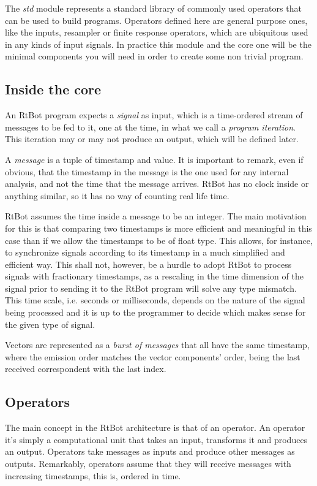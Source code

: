 \documentclass[preprint,1p,times]{elsarticle}
\begin{document}
The \textit{std} module represents a standard library of commonly used operators that can 
be used to build programs. Operators defined here are general purpose ones, like 
the inputs, resampler or finite response operators, which are ubiquitous used in 
any kinds of input signals. In practice this module and the core one will be the 
minimal components you will need in order to create some non trivial program.

\subsection{Inside the core}
An RtBot program expects a \textit{signal} as input, which is a time-ordered stream of 
messages to be fed to it, one at the time, in what we call a \textit{program iteration}. 
This iteration may or may not produce an output, which will be defined later.

A \textit{message} is a tuple of timestamp and value. It is important to remark, even if 
obvious, that the timestamp in the message is the one used for any internal 
analysis, and not the time that the message arrives. RtBot has no clock inside or 
anything similar, so it has no way of counting real life time.


RtBot assumes the time inside a message to be an integer. The main motivation for 
this is that comparing two timestamps is more efficient and meaningful in this 
case than if we allow the timestamps to be of float type. This allows, for 
instance, to synchronize signals according to its timestamp in a much simplified 
and efficient way. This shall not, however, be a hurdle to adopt RtBot to process 
signals with fractionary timestamps, as a rescaling in the time dimension of the 
signal prior to sending it to the RtBot program will solve any type mismatch. This 
time scale, i.e. seconds or milliseconds, depends on the nature of the signal 
being processed and it is up to the programmer to decide which makes sense for the 
given type of signal.


Vectors are represented as a \textit{burst of messages} that all have the same timestamp,
where the emission order matches the vector components' order, being the last received
correspondent with the last index.

\subsection{Operators}
The main concept in the RtBot architecture is that of an operator. An operator 
it’s simply a computational unit that takes an input, transforms it and produces 
an output. Operators take messages as inputs and produce other messages as 
outputs. Remarkably, operators assume that they will receive messages with 
increasing timestamps, this is, ordered in time.
\end{document}
